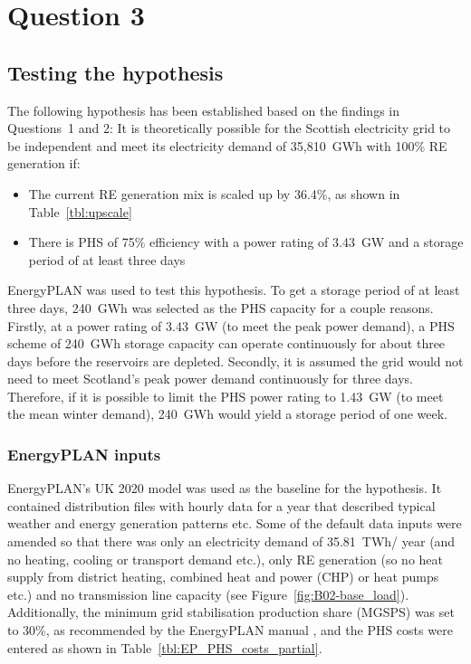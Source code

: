 \section{Question 3}



\subsection{Testing the hypothesis}

The following hypothesis has been established based on the findings in Questions~1 and 2:
It is theoretically possible for the Scottish electricity grid to be independent and meet its electricity demand of 35,810~GWh with 100\% RE generation if:
\begin{itemize}
	\item The current RE generation mix is scaled up by 36.4\%, as shown in Table~\ref{tbl:upscale}
	\item There is PHS of 75\% efficiency with a power rating of 3.43~GW and a storage period of at least three days
\end{itemize}

EnergyPLAN was used to test this hypothesis.
To get a storage period of at least three days, 240~GWh was selected as the PHS capacity for a couple reasons.
Firstly, at a power rating of 3.43~GW (to meet the peak power demand), a PHS scheme of 240~GWh storage capacity can operate continuously for about three days before the reservoirs are depleted.
Secondly, it is assumed the grid would not need to meet Scotland's peak power demand continuously for three days.
Therefore, if it is possible to limit the PHS power rating to 1.43~GW (to meet the mean winter demand), 240~GWh would yield a storage period of one week.



\subsubsection{EnergyPLAN inputs}

EnergyPLAN's UK 2020 model \citep{EnergyPLAN_UK2020} was used as the baseline for the hypothesis.
It contained distribution files with hourly data for a year that described typical weather and energy generation patterns etc.
Some of the default data inputs were amended so that there was only an electricity demand of 35.81~TWh/ year (and no heating, cooling or transport demand etc.), only RE generation (so no heat supply from district heating, combined heat and power (CHP) or heat pumps etc.) and no transmission line capacity (see Figure~\ref{fig:B02-base_load}).
Additionally, the minimum grid stabilisation production share (MGSPS) was set to 30\%, as recommended by the EnergyPLAN manual \citep{Lund2017}, and the PHS costs were entered as shown in Table~\ref{tbl:EP_PHS_costs_partial}.

